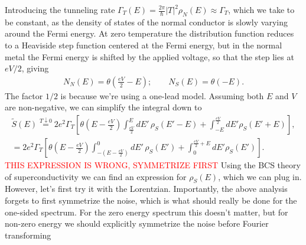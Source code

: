 Introducing the tunneling rate $\Gamma_T(E) = \frac{2\pi}{\hbar}|T|^2 \rho_N(E) \approx \Gamma_T$, which we take to be constant, as the density of states of the normal conductor is slowly varying around the Fermi energy. At zero temperature the distribution function reduces to a Heaviside step function centered at the Fermi energy, but in the normal metal the Fermi energy is shifted by the applied voltage, so that the step lies at $eV/2$, giving
\begin{align}
    N_N(E) = \theta\left(\frac{eV}{2}-E\right); \qquad N_S(E) = \theta\left(-E\right).
\end{align}
The factor $1/2$ is because we're using a one-lead model. Assuming both $E$ and $V$ are non-negative, we can simplify the integral down to
\begin{align}
    \tilde{S}(E) \overset{T\downarrow0}{=
    }2e^2\Gamma_T\left[\theta\left(E-\frac{eV}{2}\right)\int_{\frac{eV}{2}}^{E}dE'\,\rho_S(E'-E) + \int_{-E}^{\frac{eV}{2}}dE'\rho_S(E'+E)\right], \\
    = 2e^2\Gamma_T\left[\theta\left(E-\frac{eV}{2}\right)\int_{-(E-\frac{eV}{2})}^0dE'\,\rho_S(E') + \int_{0}^{\frac{eV}{2}+E}dE'\rho_S(E')\right].
\end{align}
\textcolor{red}{THIS EXPRESSION IS WRONG, SYMMETRIZE FIRST}
Using the BCS theory of superconductivity we can find an expression for $\rho_S(E)$, which we can plug in. However, let's first try it with the Lorentzian. Importantly, the above analysis forgets to first symmetrize the noise, which is what should really be done for the one-sided spectrum. For the zero energy spectrum this doesn't matter, but for non-zero energy we should explicitly symmetrize the noise before Fourier transforming






